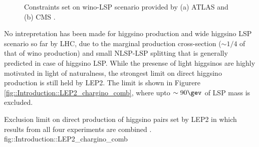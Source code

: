 \begin{figure}[h]
  \centering
    \caption{Constraints set on wino-LSP scenario provided by (a) ATLAS \cite{ATLAS_SUSY_LLDT} and (b) CMS \cite{CMS_SUSY_LLDT_Run1}.}
    \label{fig::Introduction::LHCLimitWino}
\end{figure}

No intrepretation has been made for higgsino production and wide higgsino LSP scenario so far by LHC, 
due to the marginal production cross-section ($\sim 1/4$ of that of wino production) and small NLSP-LSP splitting that is generally predicted in case of higgsino LSP.
While the presense of light higgsinos are highly motivated in light of naturalness, 
the strongest limit on direct higgsino production is still held by LEP2.
The limit is shown in Figurere \ref{fig::Introduction::LEP2_chargino_comb}, where upto $\sim 90\gev$ of LSP mass is excluded.

{Exclusion limit on direct production of higgsino pairs set by LEP2 in which results from all four experiments are combined \cite{LEP2LowDMChargino}.}
{fig::Introduction::LEP2_chargino_comb}


